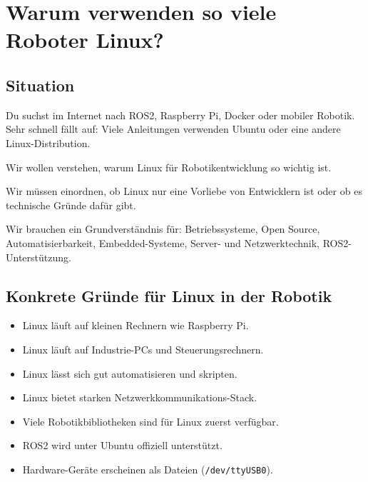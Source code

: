 
\chapter{Warum verwenden so viele Roboter Linux?}

\kapitelstruktur


\section{Situation}

Du suchst im Internet nach ROS2, Raspberry Pi, Docker oder mobiler Robotik.
Sehr schnell fällt auf: Viele Anleitungen verwenden Ubuntu oder eine andere
Linux-Distribution.

\begin{aufgabeBox}
Wir wollen verstehen, warum Linux für Robotikentwicklung so wichtig ist.
\end{aufgabeBox}

\begin{problemBox}
Wir müssen einordnen, ob Linux nur eine Vorliebe von Entwicklern ist
oder ob es technische Gründe dafür gibt.
\end{problemBox}

\begin{wissenBox}
Wir brauchen ein Grundverständnis für: Betriebssysteme, Open Source,
Automatisierbarkeit, Embedded-Systeme, Server- und Netzwerktechnik,
ROS2-Unterstützung.
\end{wissenBox}

\section{Konkrete Gründe für Linux in der Robotik}

\begin{itemize}
  \item Linux läuft auf kleinen Rechnern wie Raspberry Pi.
  \item Linux läuft auf Industrie-PCs und Steuerungsrechnern.
  \item Linux lässt sich gut automatisieren und skripten.
  \item Linux bietet starken Netzwerkkommunikations-Stack.
  \item Viele Robotikbibliotheken sind für Linux zuerst verfügbar.
  \item ROS2 wird unter Ubuntu offiziell unterstützt.
  \item Hardware-Geräte erscheinen als Dateien (\texttt{/dev/ttyUSB0}).
\end{itemize}

